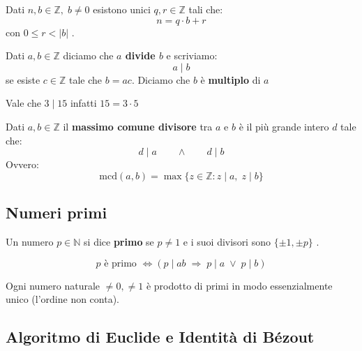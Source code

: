 \documentclass[
  a4paper,
]{article}
\begin{document}
\begin{teoremabox}
Dati \(n, b \in \mathbb{Z}, \; b \neq 0\) esistono unici
\(q, r \in \mathbb{Z}\) tali che: \[
n = q\cdot b + r
\] con \(0 \leq r < |b|\) .
\end{teoremabox}

\begin{definitionbox}
Dati \(a, b \in \mathbb{Z}\) diciamo che \textbf{\(a\) divide \(b\)} e
scriviamo: \[
a \mid b
\] se esiste \(c \in \mathbb{Z}\) tale che \(b = ac\). Diciamo che \(b\)
è \textbf{multiplo} di \(a\)
\end{definitionbox}

\begin{examplebox}
Vale che \(3 \mid 15\) infatti \(15 = 3 \cdot 5\)
\end{examplebox}

\begin{definitionbox}
Dati \(a, b \in \mathbb{Z}\) il \textbf{massimo comune divisore} tra
\(a\) e \(b\) è il più grande intero \(d\) tale che: \[
d \mid a \qquad \land \qquad d \mid b
\] Ovvero: \[
\text{mcd}(a, b) = \max\{z \in \mathbb{Z} : z \mid a,\; z \mid b \}
\]
\end{definitionbox}

\hypertarget{numeri-primi}{%
\subsection{Numeri primi}\label{numeri-primi}}

\begin{definitionbox}
Un numero \(p \in \mathbb{N}\) si dice \textbf{primo} se \(p \neq 1\) e
i suoi divisori sono \(\{\pm 1, \pm p \}\) .
\end{definitionbox}

\begin{propositionbox}
\[
p \text{ è primo } \iff (p \mid ab \; \Longrightarrow \; p \mid a \;\lor \; p \mid b)
\]
\end{propositionbox}

\begin{teoremabox}
Ogni numero naturale \(\neq 0, \neq 1\) è prodotto di primi in modo
essenzialmente unico (l'ordine non conta).
\end{teoremabox}

\hypertarget{algoritmo-di-euclide-e-identituxe0-di-buxe9zout}{%
\subsection{Algoritmo di Euclide e Identità di
Bézout}\label{algoritmo-di-euclide-e-identituxe0-di-buxe9zout}}
\end{document}
